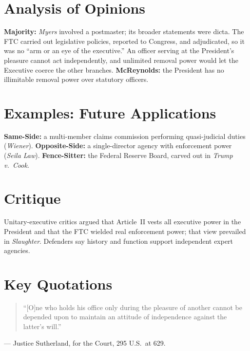 \documentclass[12pt]{article}
\begin{document}
\section{Analysis of Opinions}
\textbf{Majority:} \textit{Myers} involved a postmaster; its broader statements were dicta. The FTC carried out legislative policies, reported to Congress, and adjudicated, so it was no ``arm or an eye of the executive.'' An officer serving at the President's pleasure cannot act independently, and unlimited removal power would let the Executive coerce the other branches. \textbf{McReynolds:} the President has no illimitable removal power over statutory officers.

\section{Examples: Future Applications}
\textbf{Same-Side:} a multi-member claims commission performing quasi-judicial duties (\textit{Wiener}). \textbf{Opposite-Side:} a single-director agency with enforcement power (\textit{Seila Law}). \textbf{Fence-Sitter:} the Federal Reserve Board, carved out in \textit{Trump v.\ Cook}.

\section{Critique}
Unitary-executive critics argued that Article~II vests all executive power in the President and that the FTC wielded real enforcement power; that view prevailed in \textit{Slaughter}. Defenders say history and function support independent expert agencies.

\section{Key Quotations}
\begin{quote}
``[O]ne who holds his office only during the pleasure of another cannot be depended upon to maintain an attitude of independence against the latter's will.''
\end{quote}
\noindent --- Justice Sutherland, for the Court, 295 U.S.\ at 629.
\end{document}
